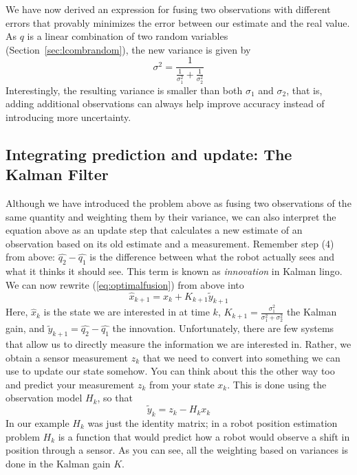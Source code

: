 We have now derived an expression for fusing two observations with different errors that provably minimizes the error between our estimate and the real value. As $q$ is a linear combination of two random variables (Section~\ref{sec:lcombrandom}), the new variance is given by
\begin{equation}
\sigma^2=\frac{1}{\frac{1}{\sigma_1^2}+\frac{1}{\sigma_2^2}}
\end{equation}
Interestingly, the resulting variance is smaller than both $\sigma_1$ and $\sigma_2$, that is, adding additional observations can always help improve accuracy instead of introducing more uncertainty.

\subsection{Integrating prediction and update: The Kalman Filter}
Although we have introduced the problem above as fusing two observations of the same quantity and weighting them by their variance, we can also interpret the equation above as an update step that calculates a new estimate of an observation based on its old estimate and a measurement. Remember step (4) from above: $ \hat{q_2}-\hat{q_1}$ is the difference between what the robot actually sees and what it thinks it should see. This term is known as \textsl{innovation} in Kalman lingo. We can now
rewrite (\ref{eq:optimalfusion}) from above into
\begin{equation}
\hat{x}_{k+1}=\hat{x}_k+K_{k+1}\tilde{y}_{k+1}
\end{equation}
Here, $ \hat{x}_k$ is the state we are interested in at time $ k$, $ K_{k+1}=\frac{\sigma_1^2}{\sigma_1^2+\sigma_2^2}$ the Kalman gain, and $ \tilde{y}_{k+1}=\hat{q_2}-\hat{q_1}$  the innovation. Unfortunately, there are few systems that allow us to directly measure the information we are interested in. Rather, we obtain a sensor measurement $ z_k$ that we need to convert into something we can use to update our state somehow. You can think about this the other way too and predict your measurement $ z_k$ from your state $ x_k$. This is done using the observation model $ H_k$, so that
\begin{equation}
\tilde{y}_{k}=z_k-H_k x_k
\end{equation}
In our example $ H_k$ was just the identity matrix; in a robot position estimation problem $ H_k$ is a function that would predict how a robot would observe a shift in position through a sensor. As you can see, all the weighting based on variances is done in the Kalman gain $ K$.
